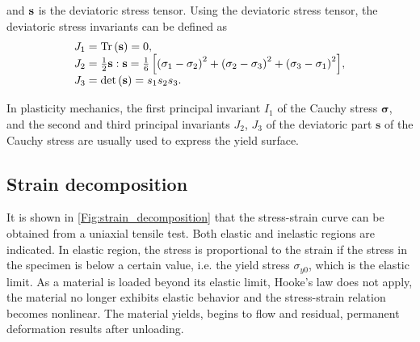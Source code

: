 and $\bf{s}$ is the deviatoric stress tensor.
Using the deviatoric stress tensor, the deviatoric stress invariants can be defined as
\begin{equation}
\begin{array}{*{20}{l}}
{{J_1} = {\rm{Tr}}\left( {\bf{s}} \right) = 0},\\
{{J_2} = \frac{1}{2}{\bf{s}}:{\bf{s}} = \frac{1}{6}\left[ {{{\left( {{\sigma _1} - {\sigma _2}} \right)}^2} + {{\left( {{\sigma _2} - {\sigma _3}} \right)}^2} + {{\left( {{\sigma _3} - {\sigma _1}} \right)}^2}} \right]},\\
{{J_3} = \det \left( {\bf{s}} \right) = {s_1}{s_2}{s_3}}.
\end{array}
\end{equation}

In plasticity mechanics, the first principal invariant $I_1$ of the Cauchy stress $\boldsymbol{\sigma}$, and the second and third principal invariants $J_2$, $J_3$ of the deviatoric part $\boldsymbol{s}$ of the Cauchy stress are usually used to express the yield surface.


\subsection{Strain decomposition}
\noindent
It is shown in \ref{Fig:strain_decomposition} that the stress-strain curve can be obtained from a uniaxial tensile test.
Both elastic and inelastic regions are indicated.
In elastic region, the stress is proportional to the strain if the stress in the specimen is below a certain value, i.e. the yield stress $\sigma_{y0}$, which is the elastic limit.
As a material is loaded beyond its elastic limit, Hooke's law does not apply, the material no longer exhibits elastic behavior and the stress-strain relation becomes nonlinear. The material yields, begins to flow and residual, permanent deformation results after unloading.

